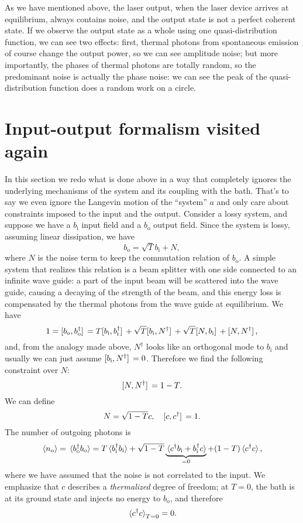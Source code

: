 \documentclass[hyperref, a4paper]{article}
\newcommand*{\bi}{b_{\text{i}}}
\newcommand*{\bo}{b_{\text{o}}}
\begin{document}
As we have mentioned above,
the laser output, when the laser device arrives at equilibrium, always contains noise,
and the output state is not a perfect coherent state.
If we observe the output state as a whole using one quasi-distribution function, 
we can see two effects: 
first, thermal photons from spontaneous emission of course change the output power,
so we can see amplitude noise;
but more importantly, the phases of thermal photons are totally random,
so the predominant noise is actually the phase noise:
we can see the peak of the quasi-distribution function does a random work on a circle.

\section{Input-output formalism visited again}

In this section we redo what is done above in a way 
that completely ignores the underlying mechanisms of the system and its coupling with the bath.
That's to say we even ignore the Langevin motion of the ``system'' $a$ 
and only care about constraints imposed to the input and the output.
Consider a lossy system, and suppose we have a $\bi$ input field and a $\bo$ output field.
Since the system is lossy, assuming linear dissipation, we have 
\begin{equation}
    \bo = \sqrt{T} \bi + N,
\end{equation}
where $N$ is the noise term to keep the commutation relation of $\bo$.
A simple system that realizes this relation is a beam splitter 
with one side connected to an infinite wave guide:
a part of the input beam will be scattered into the wave guide,
causing a decaying of the strength of the beam,
and this energy loss is compensated by the thermal photons from the wave guide at equilibrium.
We have 
\begin{equation}
    1 = \comm*{\bo}{\bo^\dag} = T \comm*{\bi}{\bi^\dag} + \sqrt{T} \comm*{\bi}{N^\dag} + \sqrt{T} \comm*{N}{\bi} + \comm*{N}{N^\dag},
\end{equation}
and, from the analogy made above, $N^\dag$ looks like an orthogonal mode to $\bi$
and usually we can just assume $\comm*{\bi}{N^\dag} = 0$.
Therefore we find the following constraint over $N$:
\begin{equation}
    \comm*{N}{N^\dag} = 1 - T.
\end{equation}
We can define 
\begin{equation}
    N = \sqrt{1-T} c, \quad \comm*{c}{c^\dag} = 1.
\end{equation}
The number of outgoing photons is 
\begin{equation}
    \expval*{n_{\text{o}}} = \expval*{\bo^\dag \bo}
    = T \expval*{\bi^\dag \bi} + \sqrt{1-T} \underbrace{\expval*{c^\dag \bi + \bi^\dag c}}_{=0} + (1-T) \expval*{c^\dag c},
\end{equation}
where we have assumed that the noise is not correlated to the input.
We emphasize that $c$ describes a \emph{thermalized} degree of freedom;
at $T=0$, the bath is at its ground state and injects no energy to $\bo$,
and therefore 
\begin{equation}
    \expval*{c^\dag c}_{T=0} = 0.
\end{equation}
\end{document}
